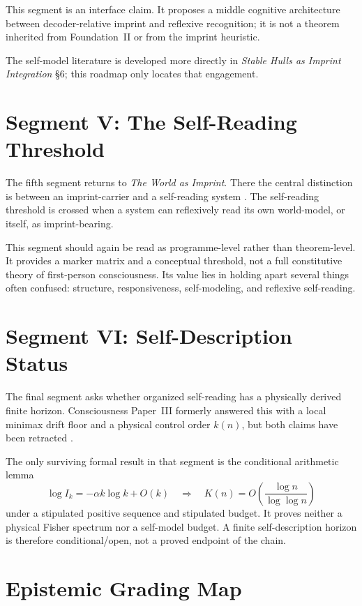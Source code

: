 \documentclass[12pt,a4paper]{article}
\begin{document}
This segment is an interface claim. It proposes a middle cognitive
architecture between decoder-relative imprint and reflexive recognition;
it is not a theorem inherited from Foundation~II or from the imprint
heuristic.

The self-model literature is developed more directly in \emph{Stable Hulls as Imprint Integration} \S6; this roadmap only locates that engagement.

\section{Segment V: The Self-Reading Threshold}

The fifth segment returns to \emph{The World as Imprint}. There the central distinction is between an imprint-carrier and a self-reading system \cite{WorldImprint}. The self-reading threshold is crossed when a system can reflexively read its own world-model, or itself, as imprint-bearing.

This segment should again be read as programme-level rather than theorem-level. It provides a marker matrix and a conceptual threshold, not a full constitutive theory of first-person consciousness. Its value lies in holding apart several things often confused: structure, responsiveness, self-modeling, and reflexive self-reading.

\section{Segment VI: Self-Description Status}

The final segment asks whether organized self-reading has a physically
derived finite horizon. Consciousness Paper~III formerly answered this
with a local minimax drift floor and a physical control order
\(k(n)\), but both claims have been retracted \cite{PaperIII}.

The only surviving formal result in that segment is the conditional
arithmetic lemma
\[
\log I_k=-\alpha k\log k+O(k)
\quad\Longrightarrow\quad
K(n)=O\!\left(\frac{\log n}{\log\log n}\right)
\]
under a stipulated positive sequence and stipulated budget. It proves
neither a physical Fisher spectrum nor a self-model budget. A finite
self-description horizon is therefore conditional/open, not a proved
endpoint of the chain.

\section{Epistemic Grading Map}
\end{document}
